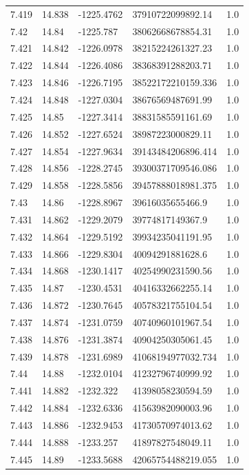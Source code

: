 \begin{tabular}{lllll}
7.419 & 14.838 & -1225.4762 & 37910722099892.14 & 1.0 \\
7.42 & 14.84 & -1225.787 & 38062668678854.31 & 1.0 \\
7.421 & 14.842 & -1226.0978 & 38215224261327.23 & 1.0 \\
7.422 & 14.844 & -1226.4086 & 38368391288203.71 & 1.0 \\
7.423 & 14.846 & -1226.7195 & 38522172210159.336 & 1.0 \\
7.424 & 14.848 & -1227.0304 & 38676569487691.99 & 1.0 \\
7.425 & 14.85 & -1227.3414 & 38831585591161.69 & 1.0 \\
7.426 & 14.852 & -1227.6524 & 38987223000829.11 & 1.0 \\
7.427 & 14.854 & -1227.9634 & 39143484206896.414 & 1.0 \\
7.428 & 14.856 & -1228.2745 & 39300371709546.086 & 1.0 \\
7.429 & 14.858 & -1228.5856 & 39457888018981.375 & 1.0 \\
7.43 & 14.86 & -1228.8967 & 39616035655466.9 & 1.0 \\
7.431 & 14.862 & -1229.2079 & 39774817149367.9 & 1.0 \\
7.432 & 14.864 & -1229.5192 & 39934235041191.95 & 1.0 \\
7.433 & 14.866 & -1229.8304 & 40094291881628.6 & 1.0 \\
7.434 & 14.868 & -1230.1417 & 40254990231590.56 & 1.0 \\
7.435 & 14.87 & -1230.4531 & 40416332662255.14 & 1.0 \\
7.436 & 14.872 & -1230.7645 & 40578321755104.54 & 1.0 \\
7.437 & 14.874 & -1231.0759 & 40740960101967.54 & 1.0 \\
7.438 & 14.876 & -1231.3874 & 40904250305061.45 & 1.0 \\
7.439 & 14.878 & -1231.6989 & 41068194977032.734 & 1.0 \\
7.44 & 14.88 & -1232.0104 & 41232796740999.92 & 1.0 \\
7.441 & 14.882 & -1232.322 & 41398058230594.59 & 1.0 \\
7.442 & 14.884 & -1232.6336 & 41563982090003.96 & 1.0 \\
7.443 & 14.886 & -1232.9453 & 41730570974013.62 & 1.0 \\
7.444 & 14.888 & -1233.257 & 41897827548049.11 & 1.0 \\
7.445 & 14.89 & -1233.5688 & 42065754488219.055 & 1.0 \\

\end{tabular}
